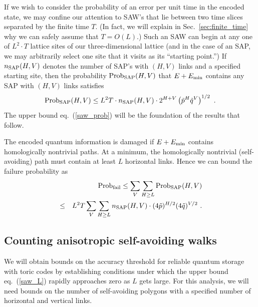 If we wish to consider the probability of an error per unit time in the encoded state, we may confine our attention to SAW's that lie between two time slices separated by the finite time $T$. (In fact, we will explain in Sec.~\ref{sec:finite_time} why we can safely assume that $T=O(L)$.)
Such an SAW can begin at any one of $L^2\cdot T$ lattice sites of our
three-dimensional lattice (and in the case of an SAP, we may arbitrarily select one
site that it visits as its ``starting point.'') If $n_{\rm SAP}(H,V)$ denotes
the number of SAP's with $(H,V)$ links and a specified starting site, then the
probability ${\rm Prob}_{\rm SAP}(H,V)$ that $E+E_{\rm min}$ contains any SAP with $(H,V)$ links satisfies
\begin{equation}
\label{saw_prob}
{\rm Prob}_{\rm SAP}(H,V)\le L^2 T \cdot n_{\rm SAP}(H,V)\cdot
2^{H+V}\left(\tilde p^{H}\tilde q^{V}\right)^{1/2}~.
\end{equation}
The upper bound eq.~(\ref{saw_prob}) will be the foundation of the
results that follow.

The encoded quantum information is damaged if $E+E_{\rm min}$ contains homologically nontrivial paths.  At a minimum, the
homologically nontrivial (self-avoiding) path must contain at least $L$
horizontal links.  Hence we can bound the failure probability as
\begin{eqnarray}
\label{saw_L}
& &{\rm Prob}_{\rm fail} \le \sum_{V}\sum_{H\ge L} {\rm Prob}_{\rm
SAP}(H,V)\nonumber\\
& \le & L^2 T \sum_{V}\sum_{H\ge L} n_{\rm SAP}(H,V)
\cdot(4\tilde p)^{H/2} (4\tilde q)^{V/2}~.
\end{eqnarray}

\subsection{Counting anisotropic self-avoiding walks}
\label{subsec:count_walks}

We will obtain  bounds on the accuracy threshold for reliable quantum storage
with toric codes by establishing conditions under which the upper bound
eq.~(\ref{saw_L}) rapidly approaches zero as $L$ gets large. For this analysis, we will need bounds on the number of
self-avoiding polygons with a specified number of horizontal and vertical links. 

